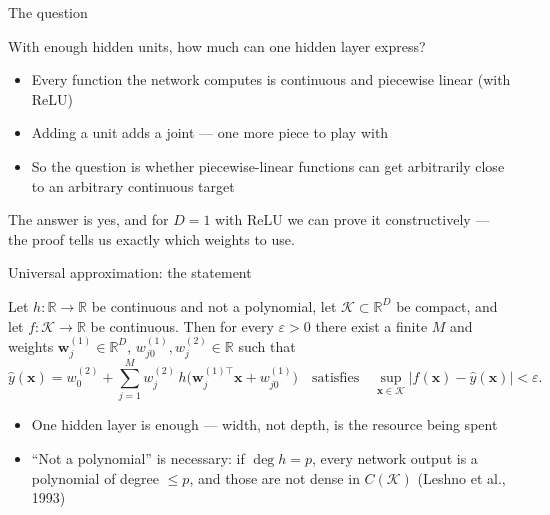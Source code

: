 \documentclass[aspectratio=169, 11pt]{beamer}
\newcommand{\src}[3]{}      %
\begin{document}
\begin{frame}{The question}
  \src{prince2023}{section}{3.2}
  With enough hidden units, how much can one hidden layer express?
  \vspace{0.5em}
  \begin{itemize}\setlength{\itemsep}{3pt}
    \item Every function the network computes is \alert{continuous
          and piecewise linear} (with ReLU)
    \item Adding a unit adds a joint --- one more piece to play with
    \item So the question is whether piecewise-linear functions can
          get \alert{arbitrarily close} to an arbitrary continuous
          target
  \end{itemize}
  \vspace{0.5em}
  \begin{redhighlight}
    The answer is yes, and for $D=1$ with ReLU we can prove it
    \alert{constructively} --- the proof tells us exactly which
    weights to use.
  \end{redhighlight}
\end{frame}

\begin{frame}{Universal approximation: the statement}
  \src{leshno1993}{section}{4}
  \src{cybenko1989}{section}{3}
  \src{hornik1991}{section}{2}
  \src{leshno1993}{section}{6}
  \begin{theorem}
    Let $h:\mathbb{R}\to\mathbb{R}$ be continuous and
    \alert{not a polynomial}, let $\mathcal{K}\subset\mathbb{R}^{D}$
    be compact, and let $f:\mathcal{K}\to\mathbb{R}$ be continuous.
    Then for every $\varepsilon>0$ there exist a finite $M$ and
    weights $\mathbf{w}^{(1)}_j\in\mathbb{R}^{D}$,
    $w^{(1)}_{j0},w^{(2)}_j\in\mathbb{R}$ such that
    \[
      \hat y(\mathbf{x})
      = w^{(2)}_0+\sum_{j=1}^{M}w^{(2)}_j\,
        h\big(\mathbf{w}^{(1)\top}_j\mathbf{x}+w^{(1)}_{j0}\big)
      \quad\text{satisfies}\quad
      \sup_{\mathbf{x}\in\mathcal{K}}\big|f(\mathbf{x})
      -\hat y(\mathbf{x})\big| < \varepsilon .
    \]
  \end{theorem}
  \vspace{0.1em}
  {\footnotesize
  \begin{itemize}\setlength{\itemsep}{0pt}
    \item One hidden layer is enough --- \alert{width}, not depth,
          is the resource being spent
    \item ``Not a polynomial'' is \alert{necessary}: if
          $\deg h = p$, every network output is a polynomial of
          degree $\le p$, and those are not dense in
          $C(\mathcal{K})$ \hfill{\scriptsize (Leshno et al., 1993)}
  \end{itemize}}
\end{frame}
\end{document}
